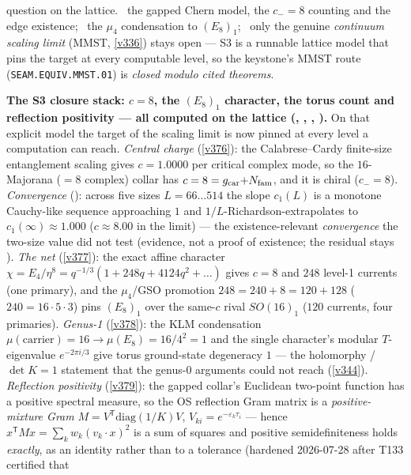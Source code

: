 question on the lattice. \mE\ the gapped Chern model, the $c_-{=}8$ counting and the edge existence; \mC\ the
$\mu_4$ condensation to $(E_8)_1$; \mO\ only the genuine \emph{continuum scaling limit} (MMST, \vref{v336}) stays
open --- S3 is a runnable lattice model that pins the target at every computable level, so the keystone's MMST
route (\texttt{SEAM.EQUIV.MMST.01}) is
\emph{closed modulo cited theorems}.
\par\smallskip\noindent\textbf{The S3 closure stack: $c=8$, the $(E_8)_1$ character, the torus count and
reflection positivity --- all computed on the lattice (,
, , ).}
On that explicit model the target of the scaling limit is now pinned at every level a computation can
reach. \emph{Central charge} (\vref{v376}): the Calabrese--Cardy finite-size entanglement scaling gives
$c=1.0000$ per critical complex mode, so the $16$-Majorana ($=8$ complex) collar has $c=8=g_{\mathrm{car}}{+}N_{\mathrm{fam}}$,
and it is chiral ($c_-=8$). \emph{Convergence} (): across five sizes
$L=66\ldots514$ the slope $c_1(L)$ is a monotone Cauchy-like sequence approaching $1$ and $1/L$-Richardson-extrapolates
to $c_1(\infty)\approx1.000$ ($c\approx8.00$ in the limit) --- the existence-relevant \emph{convergence} the two-size
value did not test (evidence, not a proof of existence; the residual stays \mO). \emph{The net} (\vref{v377}): the exact affine character
$\chi=E_4/\eta^8=q^{-1/3}(1+248q+4124q^2+\dots)$ gives $c=8$ and $248$ level-1 currents (one primary), and
the $\mu_4$/GSO promotion $248{=}240{+}8{=}120{+}128$ ($240{=}16{\cdot}5{\cdot}3$) pins $(E_8)_1$ over the
same-$c$ rival $SO(16)_1$ ($120$ currents, four primaries). \emph{Genus-1} (\vref{v378}): the KLM
condensation $\mu(\text{carrier}){=}16\to\mu(E_8){=}16/4^2{=}1$ and the single character's modular
$T$-eigenvalue $e^{-2\pi i/3}$ give torus ground-state degeneracy $1$ --- the holomorphy / $\det K{=}1$
statement that the genus-0 arguments could not reach (\vref{v344}). \emph{Reflection positivity}
(\vref{v379}): the gapped collar's Euclidean two-point function has a positive spectral measure, so the OS
reflection Gram matrix is a \emph{positive-mixture Gram}
$M=V^{\mathsf T}\mathrm{diag}(1/K)V$, $V_{ki}=e^{-\varepsilon_k\tau_i}$ --- hence
$x^{\mathsf T}Mx=\sum_kw_k(v_k\!\cdot\!x)^2$ is a sum of squares and positive semidefiniteness holds
\emph{exactly}, as an identity rather than to a tolerance (hardened 2026-07-28 after T133 certified that
